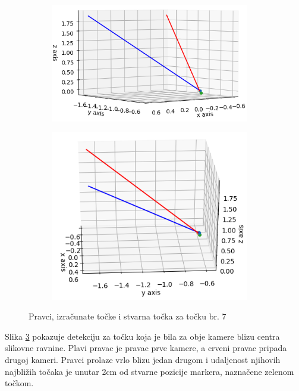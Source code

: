 \documentclass[times, utf8, diplomski]{fer}
\begin{document}
\begin{figure}[h]
\begin{subfigure}[b]{.5\textwidth}
\centering
	\includegraphics[width=0.95\textwidth]{pravci_t7_1}
	\caption*{}
	\label{fig:t7_1}
\end{subfigure}
\begin{subfigure}[b]{.5\textwidth}
	\centering
	\includegraphics[width=0.95\textwidth]{pravci_t7_2}
	\caption*{}
	\label{fig:t7_2}
\end{subfigure}
\caption{Pravci, izračunate točke i stvarna točka za točku br. 7}
\label{fig:t7}
\end{figure}

Slika \ref{fig:t7} pokazuje detekciju za točku koja je bila za obje kamere blizu centra slikovne ravnine. Plavi pravac je pravac prve kamere, a crveni pravac pripada drugoj kameri. Pravci prolaze vrlo blizu jedan drugom i udaljenost njihovih najbližih točaka je unutar 2cm od stvarne pozicije markera, naznačene zelenom točkom. 
\end{document}
